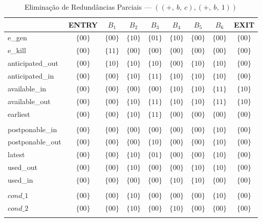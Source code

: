 \begin{table}[ht]
\centering
\begin{tabular}{l|c|c|c|c|c|c|c|c}
	& ENTRY & $B_{1}$ & $B_{2}$ & $B_{3}$ & $B_{4}$ & $B_{5}$ & $B_{6}$ & EXIT \\
\hline
e\_gen & $\{00\}$ & $\{00\}$ & $\{10\}$ & $\{01\}$ & $\{10\}$ & $\{00\}$ & $\{00\}$ & $\{00\}$ \\
e\_kill & $\{00\}$ & $\{11\}$ & $\{00\}$ & $\{00\}$ & $\{00\}$ & $\{00\}$ & $\{00\}$ & $\{00\}$ \\
anticipated\_out & $\{00\}$ & $\{10\}$ & $\{10\}$ & $\{10\}$ & $\{00\}$ & $\{10\}$ & $\{10\}$ & $\{00\}$ \\
anticipated\_in & $\{00\}$ & $\{00\}$ & $\{10\}$ & $\{11\}$ & $\{10\}$ & $\{10\}$ & $\{10\}$ & $\{00\}$ \\
available\_in & $\{00\}$ & $\{00\}$ & $\{00\}$ & $\{00\}$ & $\{10\}$ & $\{10\}$ & $\{11\}$ & $\{10\}$ \\
available\_out & $\{00\}$ & $\{00\}$ & $\{10\}$ & $\{11\}$ & $\{10\}$ & $\{10\}$ & $\{11\}$ & $\{10\}$ \\
earliest & $\{00\}$ & $\{00\}$ & $\{10\}$ & $\{11\}$ & $\{00\}$ & $\{00\}$ & $\{00\}$ & $\{00\}$ \\
 &  &  &  &  &  &  &  &  \\
postponable\_in & $\{00\}$ & $\{00\}$ & $\{00\}$ & $\{00\}$ & $\{00\}$ & $\{00\}$ & $\{10\}$ & $\{00\}$ \\
postponable\_out & $\{00\}$ & $\{00\}$ & $\{00\}$ & $\{10\}$ & $\{00\}$ & $\{00\}$ & $\{10\}$ & $\{00\}$ \\
latest & $\{00\}$ & $\{00\}$ & $\{10\}$ & $\{01\}$ & $\{00\}$ & $\{00\}$ & $\{10\}$ & $\{00\}$ \\
used\_out & $\{00\}$ & $\{00\}$ & $\{10\}$ & $\{00\}$ & $\{00\}$ & $\{10\}$ & $\{10\}$ & $\{00\}$ \\
used\_in & $\{00\}$ & $\{00\}$ & $\{00\}$ & $\{00\}$ & $\{10\}$ & $\{10\}$ & $\{00\}$ & $\{00\}$ \\
 &  &  &  &  &  &  &  &  \\
$cond\_1$ & $\{00\}$ & $\{00\}$ & $\{10\}$ & $\{00\}$ & $\{00\}$ & $\{00\}$ & $\{10\}$ & $\{00\}$ \\
$cond\_2$ & $\{00\}$ & $\{00\}$ & $\{10\}$ & $\{00\}$ & $\{10\}$ & $\{00\}$ & $\{00\}$ & $\{00\}$ \\
\\
\end{tabular}
\caption{Elimina\c{c}\~ao de Redund\^ancias Parciais --- $((+,\:b,\:c), (+,\:b,\:1))$}
\end{table}



